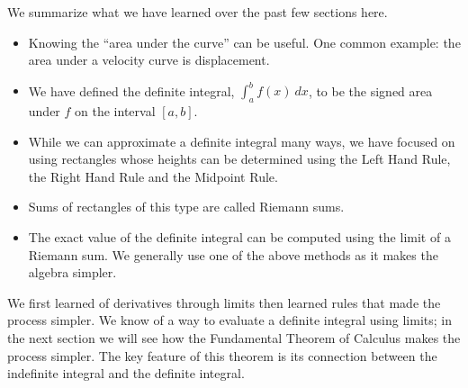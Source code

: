 We summarize what we have learned over the past few sections here.
\begin{itemize}
\item		Knowing the ``area under the curve'' can be useful. One common example: the area under a velocity curve is displacement.
\item		We have defined the definite integral, $\int_a^b f(x)\ dx$, to be the signed area under $f$ on the interval $[a,b]$. 
\item		While we can approximate a definite integral many ways, we have focused on using rectangles whose heights can be determined using the Left Hand Rule, the Right Hand Rule and the Midpoint Rule. 
\item		Sums of rectangles of this type are called Riemann sums.
\item		The exact value of the definite integral can be computed using the limit of a Riemann sum. We generally use one of the above methods as it makes the algebra simpler.
\end{itemize}

We first learned of derivatives through limits then learned rules that made the process simpler. We know of a way to evaluate a definite integral using limits; in the next section we will see how the Fundamental Theorem of Calculus makes the process simpler. The key feature of this theorem is its connection between the indefinite integral and the definite integral.

